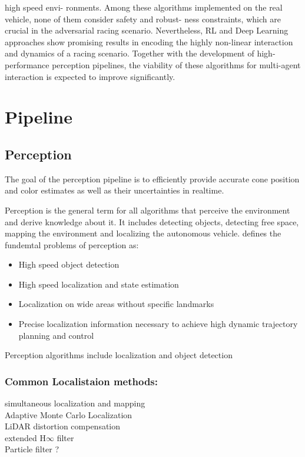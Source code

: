high speed envi- ronments. Among these algorithms implemented on the real vehicle, none of them consider safety and robust- ness constraints, which are crucial in the adversarial racing scenario. Nevertheless, RL and Deep Learning approaches show promising results in encoding the highly non-linear interaction and dynamics of a racing scenario. Together with the development of high-performance perception pipelines, the viability of these algorithms for multi-agent interaction is expected to improve significantly.


\cite{deepLearning19}


\cite{softwareArch19}


\cite{indyChallange22}


\cite{TUM23}



\cite{AMZ20}

\section{Pipeline}
\subsection{Perception}
The goal of the perception pipeline is to efficiently provide accurate cone position and color estimates as well as their uncertainties in realtime.\cite{AMZ20}

Perception is the general term for all algorithms that perceive the environment and derive knowledge about it. It includes detecting objects, detecting free space, mapping the environment and localizing the autonomous vehicle. \cite{johan22} defines the fundemtal problems of perception as:
\begin{itemize}
	\item High speed object detection
	\item High speed localization and state estimation
	\item Localization on wide areas without specific landmarks
	\item Precise localization information necessary to achieve high dynamic trajectory planning and control
\end{itemize}

Perception algorithms include localization and object detection \cite{johan22} 

\subsubsection{Common Localistaion methods:}
\begin{description}
	\item[simultaneous localization and mapping] 
	\item[Adaptive Monte Carlo Localization] 
	\item[LiDAR distortion compensation] 
	\item[extended H$\infty$ filter] 
	\item[Particle filter ?] 
\end{description}
\cite{johan22}

